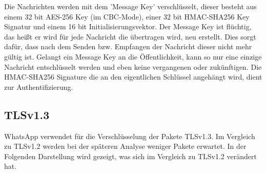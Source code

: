 Die Nachrichten werden mit dem 'Message Key' verschlüsselt, dieser besteht aus einem 32 bit AES-256 Key (im CBC-Mode), einer 32 bit HMAC-SHA256 Key Signatur und einem 16 bit Initialisierungsvektor. 
Der Message Key ist flüchtig, das heißt er wird für jede Nachricht die übertragen wird, neu erstellt.
Dies sorgt dafür, dass nach dem Senden bzw. Empfangen der Nachricht dieser nicht mehr 
gültig ist. Gelangt ein Message Key an die Öffentlichkeit, kann so nur eine einzige Nachricht
entschlüsselt werden und eben keine vergangenen oder zukünftigen.
Die HMAC-SHA256 Signature die an den eigentlichen Schlüssel angehängt wird, dient
zur Authentifizierung.

\subsection{TLSv1.3}
\cite{tls} WhatsApp verwendet für die Verschlüsselung der Pakete TLSv1.3.
Im Vergleich zu TLSv1.2 werden bei der späteren Analyse weniger Pakete erwartet.
In der Folgenden Darstellung wird gezeigt, was sich im Vergleich zu 
TLSv1.2 verändert hat. 

